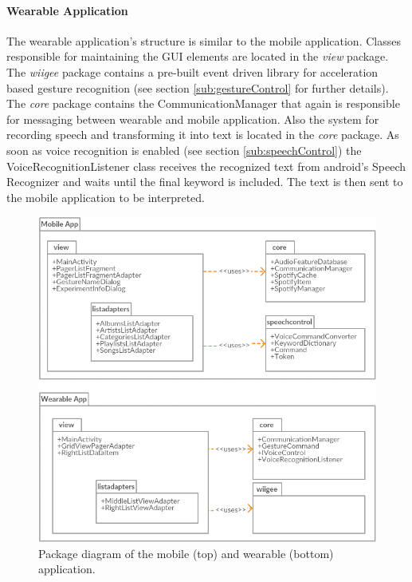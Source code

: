 \paragraph{Wearable Application}
The wearable application's structure is similar to the mobile application. Classes responsible for maintaining the \ac{GUI} elements are located in the \textit{view} package. The \textit{wiigee} package contains a pre-built event driven library for acceleration based gesture recognition (see section \ref{sub:gestureControl} for further details). The \textit{core} package contains the CommunicationManager that again is responsible for messaging between wearable and mobile application. Also the system for recording speech and transforming it into text is located in the \textit{core} package. As soon as voice recognition is enabled (see section \ref{sub:speechControl}) the VoiceRecognitionListener class receives the recognized text from android's Speech Recognizer and waits until the final keyword is included. The text is then sent to the mobile application to be interpreted.


\begin{figure}[bth]
	\myfloatalign
	\includegraphics[width=1\linewidth]{img/PackageDiagramCombined.png}
	\caption{Package diagram of the mobile (top) and wearable (bottom) application.}
	\label{fig:packageDiagram}
\end{figure}

